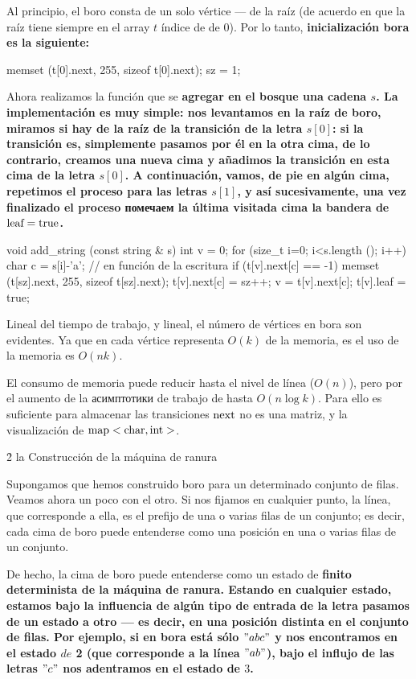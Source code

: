 Al principio, el boro consta de un solo vértice --- de la raíz (de acuerdo en que la raíz tiene siempre en el array $t$ índice de de $0$). Por lo tanto, \bf{inicialización} bora es la siguiente:

\code
memset (t[0].next, 255, sizeof t[0].next);
sz = 1;
\endcode

Ahora realizamos la función que se \bf{agregar en el bosque} una cadena $s$. La implementación es muy simple: nos levantamos en la raíz de boro, miramos si hay de la raíz de la transición de la letra $s[0]$: si la transición es, simplemente pasamos por él en la otra cima, de lo contrario, creamos una nueva cima y añadimos la transición en esta cima de la letra $s[0]$. A continuación, vamos, de pie en algún cima, repetimos el proceso para las letras $s[1]$, y así sucesivamente, una vez finalizado el proceso помечаем la última visitada cima la bandera de $\rm leaf = true$.

\code
void add_string (const string & s) {
int v = 0;
for (size_t i=0; i<s.length (); i++) {
char c = s[i]-'a'; // en función de la escritura
if (t[v].next[c] == -1) {
memset (t[sz].next, 255, sizeof t[sz].next);
t[v].next[c] = sz++;
}
v = t[v].next[c];
}
t[v].leaf = true;
}
\endcode

Lineal del tiempo de trabajo, y lineal, el número de vértices en bora son evidentes. Ya que en cada vértice representa $O (k)$ de la memoria, es el uso de la memoria es $O (n k)$.

El consumo de memoria puede reducir hasta el nivel de línea ($O (n)$), pero por el aumento de la асимптотики de trabajo de hasta $O (n \log k)$. Para ello es suficiente para almacenar las transiciones $\rm next$ no es una matriz, y la visualización de $\rm map<char,int>$.


\h2{ la Construcción de la máquina de ranura }

Supongamos que hemos construido boro para un determinado conjunto de filas. Veamos ahora un poco con el otro. Si nos fijamos en cualquier punto, la línea, que corresponde a ella, es el prefijo de una o varias filas de un conjunto; es decir, cada cima de boro puede entenderse como una posición en una o varias filas de un conjunto.

De hecho, la cima de boro puede entenderse como un estado de \bf{finito determinista de la máquina de ranura}. Estando en cualquier estado, estamos bajo la influencia de algún tipo de entrada de la letra pasamos de un estado a otro --- es decir, en una posición distinta en el conjunto de filas. Por ejemplo, si en bora está sólo $"abc"$ y nos encontramos en el estado $de$ 2 (que corresponde a la línea $"ab"$), bajo el influjo de las letras $"c"$ nos adentramos en el estado de $3$.

